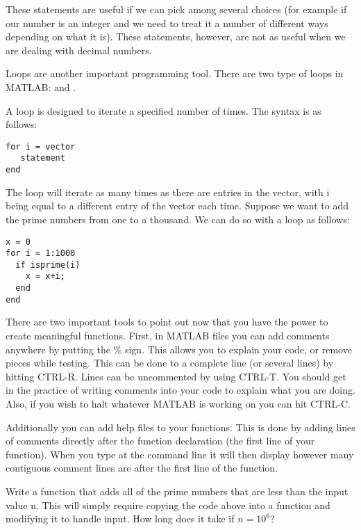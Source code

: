 These statements are useful if we can pick among several choices (for example if our number is an integer and we need to treat it a number of different ways depending on what it is). These statements, however, are not as useful when we are dealing with decimal numbers.

Loops are another important programming tool. There are two type of loops in MATLAB:  and .

A  loop is designed to iterate a specified number of times. The syntax is as follows:
\begin{lstlisting}[style=matlab]
for i = vector
   statement
end
\end{lstlisting}

The loop will iterate as many times as there are entries in the vector, with i being equal to a different entry of the vector each time. Suppose we want to add the prime numbers from one to a thousand. We can do so with a  loop as follows:

\begin{lstlisting}[style=matlab]
x = 0
for i = 1:1000
  if isprime(i)
    x = x+i;
  end
end
\end{lstlisting}

There are two important tools to point out now that you have the power to create meaningful functions. First, in MATLAB files you can add comments anywhere by putting the \% sign. This allows you to explain your code, or remove pieces while testing. This can be done to a complete line (or several lines) by hitting CTRL-R. Lines can be uncommented by using CTRL-T. You should get in the practice of writing comments into your code to explain what you are doing. Also, if you wish to halt whatever MATLAB is working on you can hit CTRL-C.

Additionally you can add help files to your functions. This is done by adding lines of comments directly after the function declaration (the first line of your function). When you type  at the command line it will then display however many contiguous comment lines are after the first line of the function.

\begin{problem}
Write a function that adds all of the prime numbers that are less than the input value n. This will simply require copying the code above into a function and modifying it to handle input. How long does it take if $n = 10^6$? 
\end{problem}

